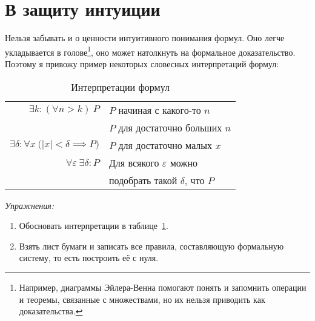 \part{В защиту интуиции}

Нельзя забывать и о ценности интуитивного понимания формул.
Оно легче укладывается в голове\footnote{Например, диаграммы
	Эйлера-Венна помогают понять и запомнить операции и теоремы, связанные с
	множествами, но их нельзя приводить как доказательства.},
оно может натолкнуть на формальное доказательство. Поэтому я привожу пример
некоторых словесных интерпретаций формул:
\begin{table}
	\centering
	\begin{tabular}{r|l}
		$\exists k:(\forall n>k)~P$     & $P$ начиная с какого-то $n$       \\
		                                & $P$ для достаточно больших $n$    \\[1em]
		$\exists \delta:\forall x~
		\big(|x|<\delta\implies P\big)$ & $P$ для достаточно малых $x$      \\[1em]
		$\forall \varepsilon~
		\exists \delta:P$               & Для всякого $\varepsilon$ можно   \\
		                                & подобрать такой $\delta$, что $P$
	\end{tabular}
	\caption{Интерпретации формул}\label{table:formula_interp}
\end{table}

{\it Упражнения:}
\begin{enumerate}
	\item{}Обосновать интерпретации в таблице~\ref{table:formula_interp}.
	\item{}Взять лист бумаги и записать
	все правила, составляющую формальную систему, то есть построить её с нуля.
\end{enumerate}

